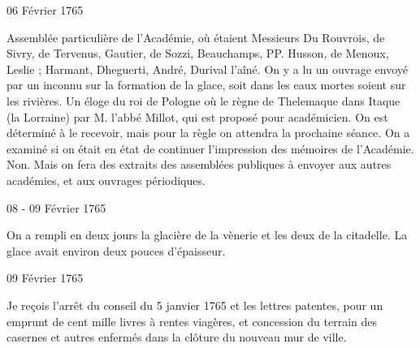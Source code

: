                      \begin{diary}{06 Février 1765}{}

                         Assemblée particulière de l'Académie, où étaient
                           Messieurs
                           Du Rouvrois, de Sivry, de
                           Tervenus, Gautier,
                           de Sozzi, Beauchamps, PP. Husson, de Menoux,
                              Leslie ;
                           Harmant, Dheguerti, André, Durival
                              l'aîné.
                           On y a lu un ouvrage envoyé par
                           un inconnu
                           sur la formation de la glace, soit dans les eaux mortes
                           soient sur les rivières. Un éloge du
                                 roi de Pologne où
                              le règne de Thelemaque dans Itaque (la Lorraine)
                           par M. l'abbé Millot, qui est
                           proposé pour
                           académicien. On est déterminé à le recevoir,
                           mais pour la règle on attendra la prochaine séance.
                           On a examiné si on était en état de continuer
                           l'impression des mémoires de l'Académie.
                           Non. Mais on fera des extraits des assemblées
                           publiques à envoyer aux autres académies,
                           et aux ouvrages périodiques. \bigskip


                     \end{diary}

                     \begin{diary}{08 - 09 Février 1765}{}

                         On a rempli en deux jours la
                           glacière de la
                              vènerie
                           et les deux de la
                              citadelle.
                           La glace
                           avait environ deux pouces d'épaisseur.
                        \bigskip


                     \end{diary}

                     \begin{diary}{09 Février 1765}{}

                         Je reçois l'arrêt du conseil du 5
                              janvier
                              1765 et les lettres patentes, pour un emprunt
                           de cent mille
                              livres à rentes viagères, et concession
                           du terrain des casernes et autres enfermés
                           dans la clôture du nouveau mur de ville. \bigskip


                     \end{diary}

